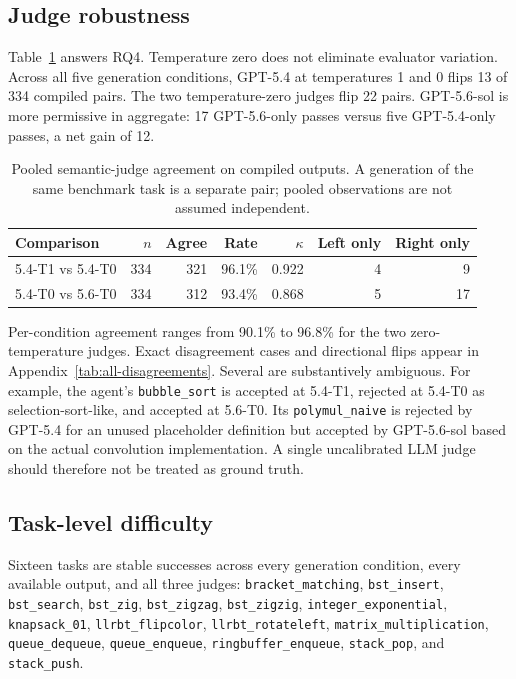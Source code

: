 \documentclass{article}
\newcommand{\task}[1]{\texttt{#1}}
\newcommand{\pct}[1]{#1\%}
\begin{document}
\subsection{Judge robustness}

Table~\ref{tab:judge-agreement-summary} answers RQ4.  Temperature zero does not
eliminate evaluator variation.  Across all five generation conditions, GPT-5.4 at
temperatures 1 and 0 flips 13 of 334 compiled pairs.  The two temperature-zero judges
flip 22 pairs.  GPT-5.6-sol is more permissive in aggregate: 17 GPT-5.6-only passes
versus five GPT-5.4-only passes, a net gain of 12.

\begin{table}[t]
\centering
\small
\caption{Pooled semantic-judge agreement on compiled outputs.  A generation of the
same benchmark task is a separate pair; pooled observations are not assumed independent.}
\label{tab:judge-agreement-summary}
\begin{tabular}{lrrrrrr}
\toprule
Comparison & $n$ & Agree & Rate & $\kappa$ & Left only & Right only \\
\midrule
5.4-T1 vs 5.4-T0 & 334 & 321 & 96.1\% & 0.922 & 4 & 9 \\
5.4-T0 vs 5.6-T0 & 334 & 312 & 93.4\% & 0.868 & 5 & 17 \\
\bottomrule
\end{tabular}
\end{table}

Per-condition agreement ranges from \pct{90.1} to \pct{96.8} for the two zero-
temperature judges.  Exact disagreement cases and directional flips appear in
Appendix~\ref{tab:all-disagreements}.  Several are substantively ambiguous.  For
example, the agent's \task{bubble\_sort} is accepted at 5.4-T1, rejected at 5.4-T0 as
selection-sort-like, and accepted at 5.6-T0.  Its \task{polymul\_naive} is rejected by
GPT-5.4 for an unused placeholder definition but accepted by GPT-5.6-sol based on the
actual convolution implementation.  A single uncalibrated LLM judge should therefore
not be treated as ground truth.

\subsection{Task-level difficulty}

Sixteen tasks are stable successes across every generation condition, every available
output, and all three judges:
\task{bracket\_matching}, \task{bst\_insert}, \task{bst\_search}, \task{bst\_zig},
\task{bst\_zigzag}, \task{bst\_zigzig}, \task{integer\_exponential},
\task{knapsack\_01}, \task{llrbt\_flipcolor}, \task{llrbt\_rotateleft},
\task{matrix\_multiplication}, \task{queue\_dequeue}, \task{queue\_enqueue},
\task{ringbuffer\_enqueue}, \task{stack\_pop}, and \task{stack\_push}.
\end{document}
